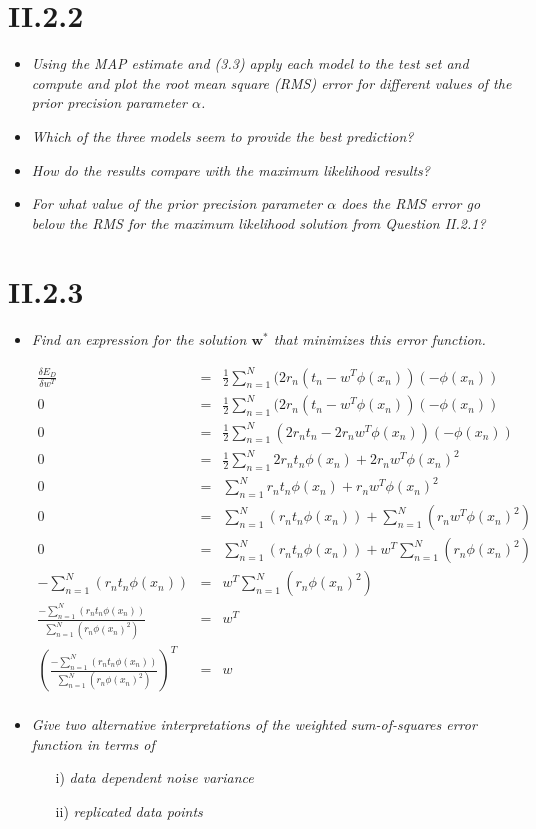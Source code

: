 \documentclass[12pt, a4paper]{article}
\begin{document}
\section{II.2.2}
\begin{itemize}
\item \textit{Using the MAP estimate and (3.3) apply each model to the test
set and compute and plot the root mean square (RMS) error for different values
of the prior precision parameter $\alpha$.}
\item \textit{Which of the three models seem to provide
the best prediction?}
\item \textit{How do the results compare with the maximum likelihood
results?}
\item \textit{For what value of the prior precision parameter $\alpha$ does the RMS error go below the RMS for the maximum likelihood solution from Question II.2.1?}
\end{itemize}

\section{II.2.3}
\begin{itemize}
\item \textit{Find an expression for the solution $\textbf{w}^*$ that minimizes this error function.}

\begin{eqnarray}
	\frac{\delta E_D}{\delta w^T} &=& \frac{1}{2}\sum^N_{n=1}(2r_n(t_n - w^T \phi (x_n))(-\phi (x_n))\\
	0 &=& \frac{1}{2}\sum^N_{n=1}(2r_n(t_n - w^T \phi (x_n))(-\phi (x_n))\\
	0 &=& \frac{1}{2}\sum^N_{n=1}(2r_nt_n - 2r_nw^T \phi (x_n))(-\phi (x_n))\\
	0 &=& \frac{1}{2}\sum^N_{n=1}2r_nt_n\phi (x_n) + 2r_nw^T \phi (x_n)^2\\	
	0 &=& \sum^N_{n=1}r_nt_n\phi (x_n) + r_nw^T \phi (x_n)^2\\
	0 &=& \sum^N_{n=1}(r_nt_n\phi (x_n)) + \sum^N_{n=1}(r_nw^T \phi (x_n)^2)\\
	0 &=& \sum^N_{n=1}(r_nt_n\phi (x_n)) + w^T\sum^N_{n=1}(r_n \phi (x_n)^2)\\
	-\sum^N_{n=1}(r_nt_n\phi (x_n)) &=& w^T\sum^N_{n=1}(r_n \phi (x_n)^2)\\
	\frac{-\sum^N_{n=1}(r_nt_n\phi (x_n))}{\sum^N_{n=1}(r_n \phi (x_n)^2)} &=& w^T\\
	\left(\frac{-\sum^N_{n=1}(r_nt_n\phi (x_n))}{\sum^N_{n=1}(r_n \phi (x_n)^2)}\right)^T &=& w\\
\end{eqnarray}


\item \textit{Give two alternative interpretations of the weighted sum-of-squares
error function in terms of}
\begin{itemize}
\item[i)] \textit{data dependent noise variance}
\item[ii)] \textit{replicated data points}
\end{itemize}
\end{itemize}
\end{document}
